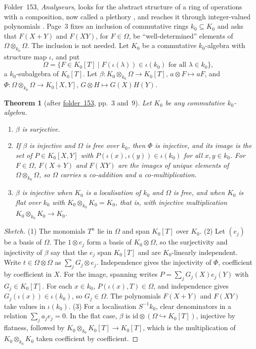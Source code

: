 \documentclass[11pt,a4paper]{amsart}
\newtheorem{theorem}{Theorem}[section]
\theoremstyle{definition}
\theoremstyle{remark}
\newcommand{\fac}[1]{\href{https://grothendieck.umontpellier.fr/#1.pdf}{folder~#1}}
\begin{document}
Folder~153, \emph{Analyseurs}, looks for the abstract structure of a ring of operations with a composition, now called a plethory \cite{tallwraith1970, borgerwieland2005}, and reaches it through integer-valued polynomials \cite{cahenchabert1997}. Page~3 fixes an inclusion of commutative rings $k_0 \subseteq K_0$ and asks that $F(X + Y)$ and $F(XY)$, for $F \in \Omega$, be ``well-determined'' elements of $\Omega \otimes_{k_0} \Omega$. The inclusion is not needed. Let $K_0$ be a commutative $k_0$-algebra with structure map $\iota$, and put
\[
\Omega = \{F \in K_0[T] \mid F(\iota(\lambda)) \in \iota(k_0) \text{ for all } \lambda \in k_0\},
\]
a $k_0$-subalgebra of $K_0[T]$. Let $\beta\colon K_0 \otimes_{k_0} \Omega \to K_0[T]$, $a \otimes F \mapsto aF$, and $\Phi\colon \Omega \otimes_{k_0} \Omega \to K_0[X, Y]$, $G \otimes H \mapsto G(X)H(Y)$.

\begin{theorem}[after \fac{153}, pp.~3 and~9]\label{thm:int}
Let $K_0$ be any commutative $k_0$-algebra.
\begin{enumerate}
\item $\beta$ is surjective.
\item If $\beta$ is injective and $\Omega$ is free over $k_0$, then $\Phi$ is injective, and its image is the set of $P \in K_0[X, Y]$ with $P(\iota(x), \iota(y)) \in \iota(k_0)$ for all $x, y \in k_0$. For $F \in \Omega$, $F(X + Y)$ and $F(XY)$ are the images of unique elements of $\Omega \otimes_{k_0} \Omega$, so $\Omega$ carries a co-addition and a co-multiplication.
\item $\beta$ is injective when $K_0$ is a localisation of $k_0$ and $\Omega$ is free, and when $K_0$ is flat over $k_0$ with $K_0 \otimes_{k_0} K_0 = K_0$, that is, with injective multiplication $K_0 \otimes_{k_0} K_0 \to K_0$.
\end{enumerate}
\end{theorem}

\begin{proof}[Sketch]
(1) The monomials $T^n$ lie in $\Omega$ and span $K_0[T]$ over $K_0$. (2) Let $(e_j)$ be a basis of $\Omega$. The $1 \otimes e_j$ form a basis of $K_0 \otimes \Omega$, so the surjectivity and injectivity of $\beta$ say that the $e_j$ span $K_0[T]$ and are $K_0$-linearly independent. Write $t \in \Omega \otimes \Omega$ as $\sum_j G_j \otimes e_j$. Independence gives the injectivity of $\Phi$, coefficient by coefficient in $X$. For the image, spanning writes $P = \sum_j G_j(X)e_j(Y)$ with $G_j \in K_0[T]$. For each $x \in k_0$, $P(\iota(x), T) \in \Omega$, and independence gives $G_j(\iota(x)) \in \iota(k_0)$, so $G_j \in \Omega$. The polynomials $F(X + Y)$ and $F(XY)$ take values in $\iota(k_0)$. (3) For a localisation $S^{-1}k_0$, clear denominators in a relation $\sum_j a_je_j = 0$. In the flat case, $\beta$ is $\mathrm{id} \otimes (\Omega \hookrightarrow K_0[T])$, injective by flatness, followed by $K_0 \otimes_{k_0} K_0[T] \to K_0[T]$, which is the multiplication of $K_0 \otimes_{k_0} K_0$ taken coefficient by coefficient.
\end{proof}
\end{document}
